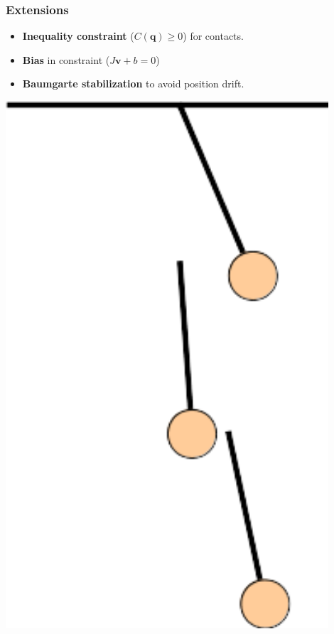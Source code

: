 \documentclass{beamer}
\begin{document}
\begin{frame}
 \frametitle{Extensions}
 \begin{minipage}{0.78\linewidth}
  \begin{itemize}
   \item \textbf{Inequality constraint} ($C(\mathbf{q}) \geq 0$) for contacts.
   \item \textbf{Bias} in constraint ($J\mathbf{v} + b = 0$)
   \pause
   \item \textbf{Baumgarte stabilization} to avoid position drift.
  \end{itemize}
 \end{minipage}
 \begin{minipage}{0.2\linewidth}
   \includegraphics[width=0.9\textwidth]{blowup.png}
 \end{minipage}

\end{frame}
\end{document}
